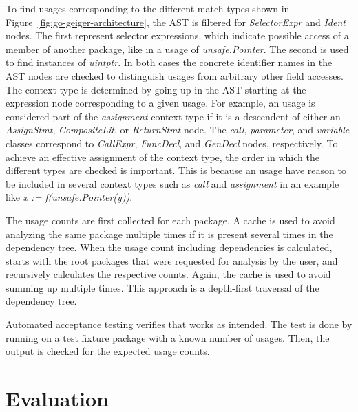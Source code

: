 To find \unsafe{} usages corresponding to the different match types shown in Figure~\ref{fig:go-geiger-architecture},
the \acrshort{AST} is filtered for \textit{SelectorExpr} and \textit{Ident} nodes.
The first represent selector expressions, which indicate possible access of a member of another package, like in a usage
of \textit{unsafe.Pointer}.
The second is used to find instances of \textit{uintptr}.
In both cases the concrete identifier names in the \acrshort{AST} nodes are checked to distinguish \unsafe{} usages from
arbitrary other field accesses.
The context type is determined by going up in the \acrshort{AST} starting at the expression node corresponding to a
given \unsafe{} usage.
For example, an \unsafe{} usage is considered part of the \textit{assignment} context type if it is a descendent of
either an \textit{AssignStmt}, \textit{CompositeLit}, or \textit{ReturnStmt} node.
The \textit{call}, \textit{parameter}, and \textit{variable} classes correspond to \textit{CallExpr}, \textit{FuncDecl},
and \textit{GenDecl} nodes, respectively.
To achieve an effective assignment of the context type, the order in which the different types are checked is important.
This is because an \unsafe{} usage have reason to be included in several context types such as \textit{call} and
\textit{assignment} in an example like \textit{x := f(unsafe.Pointer(y))}.

The \unsafe{} usage counts are first collected for each package.
A cache is used to avoid analyzing the same package multiple times if it is present several times in the dependency
tree.
When the usage count including dependencies is calculated, \toolGeiger{} starts with the root packages that were
requested for analysis by the user, and recursively calculates the respective counts.
Again, the cache is used to avoid summing up multiple times.
This approach is a depth-first traversal of the dependency tree.

Automated acceptance testing verifies that \toolGeiger{} works as intended.
The test is done by running \toolGeiger{} on a test fixture package with a known number of \unsafe{} usages.
Then, the output is checked for the expected usage counts.



\section{Evaluation}\label{sec:go-geiger-evaluation}

